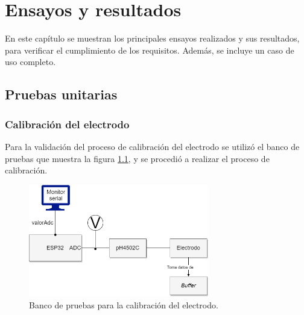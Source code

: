 
\chapter{Ensayos y resultados} %

\label{Chapter4} %

En este capítulo se muestran los principales ensayos realizados y sus resultados, para verificar el cumplimiento de los requisitos. Además, se incluye un caso de uso completo.


\section{Pruebas unitarias}
\label{sec:pruebasUnitarias}

\subsection{Calibración del electrodo}

Para la validación del proceso de calibración del electrodo se utilizó el banco de pruebas que muestra la figura \ref{fig:bancoPruebasCalibracion}, y se procedió a realizar el proceso de calibración.

\begin{figure}[htbp]
	\centering
	\includegraphics[width=0.7\textwidth]{./Figures/bancoPruebasCalibracion.png}
	\caption{Banco de pruebas para la calibración del electrodo.}
	\label{fig:bancoPruebasCalibracion}
\end{figure}

